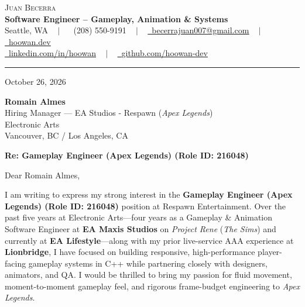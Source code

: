 \documentclass[letterpaper,11pt]{article}
\begin{document}
\begin{center}
    {\Huge \scshape Juan Becerra} \\ \vspace{4pt}
    \textbf{\large Software Engineer -- Gameplay, Animation \& Systems} \\ \vspace{4pt}
    \small Seattle, WA ~ $|$ ~
    \raisebox{-0.1\height}\faPhone\ (208) 550-9191 ~ $|$ ~
    \href{mailto:becerrajuan007@gmail.com}{\raisebox{-0.2\height}\faEnvelope\ \underline{becerrajuan007@gmail.com}} ~ $|$ ~
    \href{https://hoowan.dev}{\raisebox{-0.2\height}\faGlobe\ \underline{hoowan.dev}} \\ \vspace{2pt}
    \href{https://linkedin.com/in/hoowan/}{\raisebox{-0.2\height}\faLinkedin\ \underline{linkedin.com/in/hoowan}} ~ $|$ ~
    \href{https://github.com/hoowan-dev}{\raisebox{-0.2\height}\faGithub\ \underline{github.com/hoowan-dev}}
\end{center}

\vspace{4pt}
\hrule
\vspace{14pt}

\noindent October 26, 2026

\vspace{8pt}
\noindent \textbf{Romain Almes} \\
Hiring Manager --- EA Studios - Respawn (\emph{Apex Legends}) \\
Electronic Arts \\
Vancouver, BC / Los Angeles, CA

\vspace{8pt}
\noindent \textbf{Re: Gameplay Engineer (Apex Legends) (Role ID: 216048)}

\vspace{8pt}
\noindent Dear Romain Almes,

I am writing to express my strong interest in the \textbf{Gameplay Engineer (Apex Legends) (Role ID: 216048)} position at Respawn Entertainment. Over the past five years at Electronic Arts---four years as a Gameplay \& Animation Software Engineer at \textbf{EA Maxis Studios} on \emph{Project Rene} (\emph{The Sims}) and currently at \textbf{EA Lifestyle}---along with my prior live-service AAA experience at \textbf{Lionbridge}, I have focused on building responsive, high-performance player-facing gameplay systems in C++ while partnering closely with designers, animators, and QA. I would be thrilled to bring my passion for fluid movement, moment-to-moment gameplay feel, and rigorous frame-budget engineering to \emph{Apex Legends}.
\end{document}
